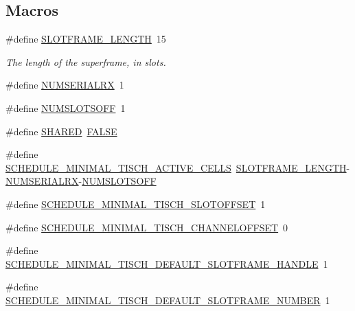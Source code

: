 \subsection*{Macros}
\begin{DoxyCompactItemize}
\item 
\#define \hyperlink{group___schedule_gaea12b586ec3f6de3ffcfff93da574345}{S\+L\+O\+T\+F\+R\+A\+M\+E\+\_\+\+L\+E\+N\+G\+TH}~15
\begin{DoxyCompactList}\small\item\em The length of the superframe, in slots. \end{DoxyCompactList}\item 
\#define \hyperlink{group___schedule_ga5206eabfac75eeed6f5066fb6d00f7c3}{N\+U\+M\+S\+E\+R\+I\+A\+L\+RX}~1
\item 
\#define \hyperlink{group___schedule_ga9fd457940c2d1313fb347b5fd32d2105}{N\+U\+M\+S\+L\+O\+T\+S\+O\+FF}~1
\item 
\#define \hyperlink{group___schedule_ga884c794595c4aa480df9022648c29564}{S\+H\+A\+R\+ED}~\hyperlink{opendefs_8h_aa93f0eb578d23995850d61f7d61c55c1}{F\+A\+L\+SE}
\item 
\#define \hyperlink{group___schedule_ga299d7e29eb70888b68ace83fd3f1a8df}{S\+C\+H\+E\+D\+U\+L\+E\+\_\+\+M\+I\+N\+I\+M\+A\+L\+\_\+T\+I\+S\+C\+H\+\_\+\+A\+C\+T\+I\+V\+E\+\_\+\+C\+E\+L\+LS}~\hyperlink{group___schedule_gaea12b586ec3f6de3ffcfff93da574345}{S\+L\+O\+T\+F\+R\+A\+M\+E\+\_\+\+L\+E\+N\+G\+TH}-\/\hyperlink{group___schedule_ga5206eabfac75eeed6f5066fb6d00f7c3}{N\+U\+M\+S\+E\+R\+I\+A\+L\+RX}-\/\hyperlink{group___schedule_ga9fd457940c2d1313fb347b5fd32d2105}{N\+U\+M\+S\+L\+O\+T\+S\+O\+FF}
\item 
\#define \hyperlink{group___schedule_ga62c64cb1c9bbbb2927f358c14535fb7f}{S\+C\+H\+E\+D\+U\+L\+E\+\_\+\+M\+I\+N\+I\+M\+A\+L\+\_\+T\+I\+S\+C\+H\+\_\+\+S\+L\+O\+T\+O\+F\+F\+S\+ET}~1
\item 
\#define \hyperlink{group___schedule_ga485a603a3e03059901c4fc5fc968a1e9}{S\+C\+H\+E\+D\+U\+L\+E\+\_\+\+M\+I\+N\+I\+M\+A\+L\+\_\+T\+I\+S\+C\+H\+\_\+\+C\+H\+A\+N\+N\+E\+L\+O\+F\+F\+S\+ET}~0
\item 
\#define \hyperlink{group___schedule_gad04163370dd0242dd8165e08223a1421}{S\+C\+H\+E\+D\+U\+L\+E\+\_\+\+M\+I\+N\+I\+M\+A\+L\+\_\+T\+I\+S\+C\+H\+\_\+\+D\+E\+F\+A\+U\+L\+T\+\_\+\+S\+L\+O\+T\+F\+R\+A\+M\+E\+\_\+\+H\+A\+N\+D\+LE}~1
\item 
\#define \hyperlink{group___schedule_ga291f502456c112dface9c0a55f3512cf}{S\+C\+H\+E\+D\+U\+L\+E\+\_\+\+M\+I\+N\+I\+M\+A\+L\+\_\+T\+I\+S\+C\+H\+\_\+\+D\+E\+F\+A\+U\+L\+T\+\_\+\+S\+L\+O\+T\+F\+R\+A\+M\+E\+\_\+\+N\+U\+M\+B\+ER}~1

\end{DoxyCompactItemize}
